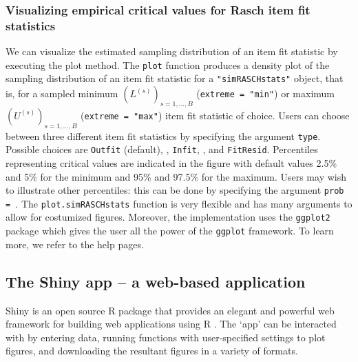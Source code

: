 \documentclass[11pt,a4paper]{article}
\begin{document}
\subsubsection{Visualizing empirical critical values for Rasch item fit statistics}

We can visualize the estimated sampling distribution of an item fit statistic by executing the plot method.
The \texttt{plot} function produces a density plot of the sampling distribution of an item fit statistic for a \texttt{"simRASCHstats"} object, that is, for a sampled minimum $(L^{(s)})_{s=1,\ldots,B}$ (\texttt{extreme = "min"}) or maximum $(U^{(s)})_{s=1,\ldots,B}$ (\texttt{extreme = "max"}) item fit statistic of choice. Users can choose between three different item fit statistics by specifying the argument \texttt{type}. Possible choices are \texttt{Outfit} (default), , \texttt{Infit}, , and \texttt{FitResid}. Percentiles representing critical values are indicated in the figure with default values 2.5\% and 5\% for the minimum and 95\% and 97.5\% for the maximum. Users may wish to illustrate other percentiles: this can be done by specifying the argument \texttt{prob = }. 
The \texttt{plot.simRASCHstats} function is very flexible and has many arguments to allow for costumized figures. Moreover, the implementation uses the \texttt{ggplot2} package \cite{ggplot2} which gives the user all the power of the \texttt{ggplot} framework. 
To learn more, we refer to the help pages.



\subsection{The Shiny app -- a web-based application}

Shiny is an open source R package that provides an elegant and powerful web framework for building web applications using R \cite{beeley2013}. The ‘app’ can be interacted with by entering data, running functions with user-specified settings to plot figures, and downloading the resultant figures in a variety of formats.
\end{document}
